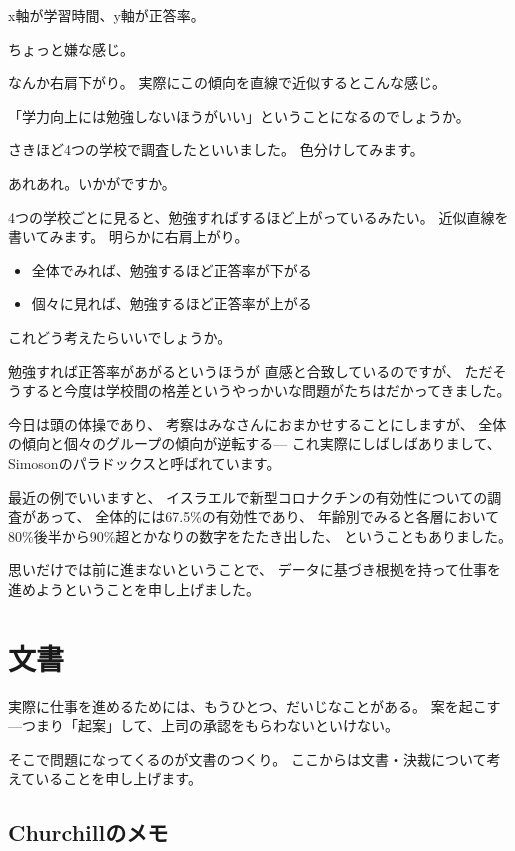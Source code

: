 \documentclass[uplatex,jis2004,dvipdfmx,12pt]{jsarticle}
\begin{document}
x軸が学習時間、y軸が正答率。

ちょっと嫌な感じ。

なんか右肩下がり。
実際にこの傾向を直線で近似するとこんな感じ。

「学力向上には勉強しないほうがいい」ということになるのでしょうか。

さきほど4つの学校で調査したといいました。
色分けしてみます。

あれあれ。いかがですか。

4つの学校ごとに見ると、勉強すればするほど上がっているみたい。
近似直線を書いてみます。
明らかに右肩上がり。


\begin{itemize}
 \item 全体でみれば、勉強するほど正答率が下がる
 \item 個々に見れば、勉強するほど正答率が上がる
\end{itemize}
これどう考えたらいいでしょうか。

勉強すれば正答率があがるというほうが
直感と合致しているのですが、
ただそうすると今度は学校間の格差というやっかいな問題がたちはだかってきました。

今日は頭の体操であり、
考察はみなさんにおまかせすることにしますが、
全体の傾向と個々のグループの傾向が逆転する---
これ実際にしばしばありまして、
Simosonのパラドックスと呼ばれています。

最近の例でいいますと、
イスラエルで新型コロナクチンの有効性についての調査があって、
全体的には67.5\%の有効性であり、
年齢別でみると各層において80\%後半から90\%超とかなりの数字をたたき出した、
ということもありました。




思いだけでは前に進まないということで、
データに基づき根拠を持って仕事を進めようということを申し上げました。
\newpage

\section{文書}


実際に仕事を進めるためには、もうひとつ、だいじなことがある。
案を起こす---つまり「起案」して、上司の承認をもらわないといけない。

そこで問題になってくるのが文書のつくり。
ここからは文書・決裁について考えていることを申し上げます。

\subsection{Churchillのメモ}
\end{document}
